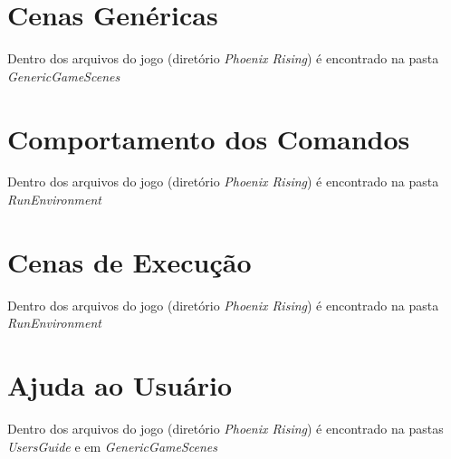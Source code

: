 \section{Cenas Genéricas}

Dentro dos arquivos do jogo (diretório \textit{Phoenix Rising}) é encontrado na
pasta \textit{GenericGameScenes}

\section{Comportamento dos Comandos}

Dentro dos arquivos do jogo (diretório \textit{Phoenix Rising}) é encontrado na
pasta \textit{RunEnvironment}

\section{Cenas de Execução}

Dentro dos arquivos do jogo (diretório \textit{Phoenix Rising}) é encontrado na
pasta \textit{RunEnvironment}

\section{Ajuda ao Usuário}

Dentro dos arquivos do jogo (diretório \textit{Phoenix Rising}) é encontrado na
pastas \textit{UsersGuide} e em \textit{GenericGameScenes} 



